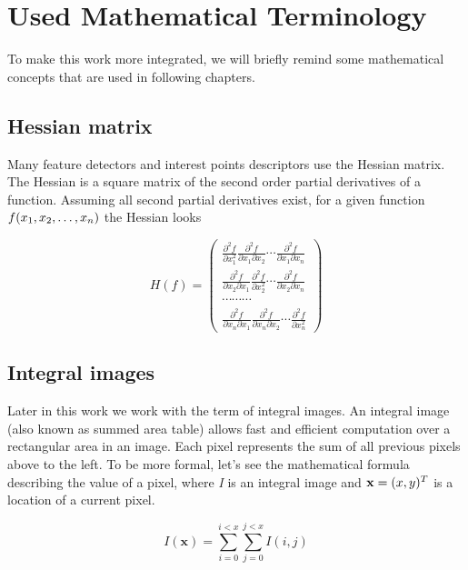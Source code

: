 \chapter{Used Mathematical Terminology}

To make this work more integrated, we will briefly remind some mathematical concepts that are used in following chapters. 

\section{Hessian matrix}

Many feature detectors and interest points descriptors use the Hessian matrix. 
The Hessian is a square matrix of the second order partial derivatives of a function. 
Assuming all second partial derivatives exist, for a given function $f(x_1, x_2, \ldots, x_n)$ the Hessian looks

\[ H(f) = \left(\begin{array}{c}  
\frac{\partial^2 f}{\partial x_1^2} \frac{\partial^2 f}{\partial x_1 \partial x_2} 
\cdots \frac{\partial^2 f}{\partial x_1 \partial x_n}\\
\frac{\partial^2 f}{\partial x_2 \partial x_1} \frac{\partial^2 f}{\partial x_2^2} 
\cdots \frac{\partial^2 f}{\partial x_2\partial x_n}\\
\cdots \cdots \cdots \\
\frac{\partial^2 f}{\partial x_n \partial x_1} \frac{\partial^2 f}{\partial x_n \partial x_2} 
\cdots \frac{\partial^2 f}{\partial x_n^2}

\end{array}\right)  \]


\section{Integral images}

Later in this work we work with the term of integral images. 
An integral image (also known as summed area table) allows fast and efficient computation over a rectangular area in an image. 
Each pixel represents the sum of all previous pixels above to the left. 
To be more formal, let's see the mathematical formula describing the value of a 
pixel, where \emph{I} is an integral image and $\mathbf{x} = (x, y)^{T}$ is a location of a current pixel.

\begin{equation}
 I (\mathbf{x}) = \sum_{i=0}^{i<x} \sum_{j=0}^{j<x} I (i,j)
\end{equation}


